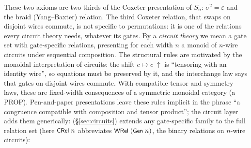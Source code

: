 \noindent These two axioms are two thirds of the Coxeter presentation of
$S_n$: $\sigma^2 = \varepsilon$ and the braid (Yang--Baxter) relation.
The third Coxeter relation, that swaps on disjoint wires commute, is not
specific to permutations: it is one of the relations every circuit
theory needs, whatever its gates.  By a
\emph{circuit theory} we mean a gate set with gate-specific relations,
presenting for each width $n$ a monoid of $n$-wire circuits under
sequential composition.  The structural rules are motivated by the
monoidal interpretation of circuits: the shift $c \mapsto c\;{\uparrow}$ is
``tensoring with an identity wire'', so equations must be preserved by
it, and the interchange law says that gates on disjoint wires commute.
With compatible tensor and symmetry laws, these are fixed-width
consequences of a symmetric monoidal category (a PROP).
Pen-and-paper presentations leave these rules implicit in the phrase ``a
congruence compatible with composition and tensor product''; the circuit
layer adds them generically:  (\S\ref{sec:circuits}) extends any
gate-specific family to the full relation set 
(here $\mbox{\textsf{\small CRel}}\;n$ abbreviates $\mbox{\textsf{\small WRel}}\;(\mbox{\textsf{\small Gen}}\;n)$, the
binary relations on $n$-wire circuits):

